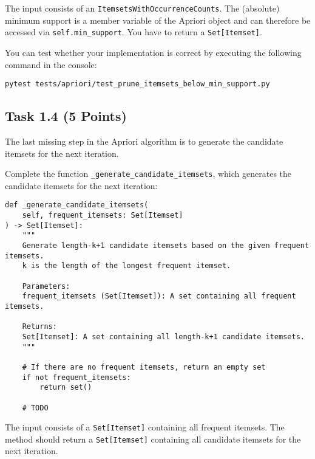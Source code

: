 \documentclass[
english,
smallborders
]{i6prcsht}
\newcommand{\points}[1]{\hfill \color{red}(#1 Points)\color{black}}
\begin{document}
\vspace*{0.1cm}

The input consists of an \texttt{ItemsetsWithOccurrenceCounts}. The (absolute) minimum support is a member variable of the Apriori object and can therefore be accessed via \texttt{self.min\_support}. You have to return a \texttt{Set[Itemset]}.

You can test whether your implementation is correct by executing the following command in the console:

\vspace*{0.3cm}

\begin{lstlisting}
pytest tests/apriori/test_prune_itemsets_below_min_support.py
\end{lstlisting}

\vspace*{0.1cm}

\subsection*{Task 1.4 \points{5}}

The last missing step in the Apriori algorithm is to generate the candidate itemsets for the next iteration.

Complete the function \texttt{\_generate\_candidate\_itemsets}, which generates the candidate itemsets for the next iteration:

\vspace*{0.3cm}

\begin{lstlisting}
def _generate_candidate_itemsets(
    self, frequent_itemsets: Set[Itemset]
) -> Set[Itemset]:
	"""
	Generate length-k+1 candidate itemsets based on the given frequent itemsets.
	k is the length of the longest frequent itemset.

	Parameters:
	frequent_itemsets (Set[Itemset]): A set containing all frequent itemsets.

	Returns:
	Set[Itemset]: A set containing all length-k+1 candidate itemsets.
	"""

	# If there are no frequent itemsets, return an empty set
	if not frequent_itemsets:
		return set()

	# TODO
\end{lstlisting}

\vspace*{0.1cm}

The input consists of a \texttt{Set[Itemset]} containing all frequent itemsets. The method should return a \texttt{Set[Itemset]} containing all candidate itemsets for the next iteration.
\end{document}

